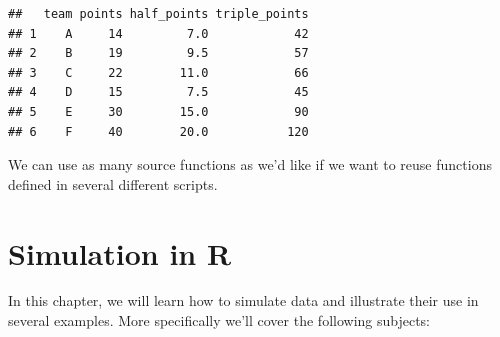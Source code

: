 \documentclass[
]{book}
\newenvironment{Shaded}{\begin{snugshade}}{\end{snugshade}}
\newcommand{\AttributeTok}[1]{\textcolor[rgb]{0.77,0.63,0.00}{#1}}
\newcommand{\DecValTok}[1]{\textcolor[rgb]{0.00,0.00,0.81}{#1}}
\newcommand{\FunctionTok}[1]{\textcolor[rgb]{0.00,0.00,0.00}{#1}}
\newcommand{\NormalTok}[1]{#1}
\newcommand{\OtherTok}[1]{\textcolor[rgb]{0.56,0.35,0.01}{#1}}
\newcommand{\SpecialCharTok}[1]{\textcolor[rgb]{0.00,0.00,0.00}{#1}}
\newcommand{\StringTok}[1]{\textcolor[rgb]{0.31,0.60,0.02}{#1}}
\begin{document}
\begin{Shaded}
\end{Shaded}

\begin{verbatim}
##   team points half_points triple_points
## 1    A     14         7.0            42
## 2    B     19         9.5            57
## 3    C     22        11.0            66
## 4    D     15         7.5            45
## 5    E     30        15.0            90
## 6    F     40        20.0           120
\end{verbatim}

We can use as many source functions as we'd like if we want to reuse functions defined in several different scripts.

\hypertarget{simulation-in-r}{%
\chapter{Simulation in R}\label{simulation-in-r}}

In this chapter, we will learn how to simulate data and illustrate their use in several examples. More specifically we'll cover the following subjects:
\end{document}
